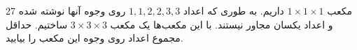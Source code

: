 27 مکعب $1 \times 1 \times 1$ داریم. به طوری که اعداد $1, 1, 2, 2, 3, 3$ روی وجوه آنها نوشته شده و اعداد یکسان مجاور نیستند. با این مکعب‌ها یک مکعب $3 \times 3 \times 3$ ساختیم. حداقل مجموع اعداد روی وجوه این مکعب را بیابید.